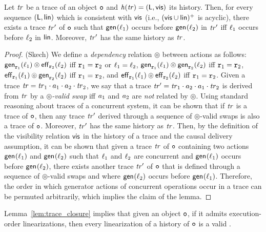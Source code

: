 \begin{lemma}\label{lem:trace_closure}
Let $\mathit{tr}$ be a trace of an object $\mathtt{o}$ and $\mathit{h}({\mathit{tr})}=(\mathsf{L},\mathsf{vis})$ its history. Then, for every sequence $(\mathsf{L},\mathsf{lin})$ which is consistent with $\mathsf{vis}$ (i.e., $(\mathsf{vis}
    \cup \mathsf{lin})^{+}$ is acyclic), there exists a trace $\mathit{tr}'$ of $\mathtt{o}$ such that $\mathsf{gen}_{}(\ell_1)$ occurs before $\mathsf{gen}_{}(\ell_2)$ in $\mathit{tr}'$ iff $\ell_1$ occurs before $\ell_2$ in $\mathsf{lin}$. Moreover, $\mathit{tr}'$ has the same history as $\mathit{tr}$.
\end{lemma}
\begin{proof}(Skech)
We define a \emph{dependency} relation $\circledcirc$ between actions as follows: $\mathsf{gen}_{\mathtt{r}_1}(\ell_1)\circledcirc \mathsf{eff}_{\mathtt{r}_2}(\ell_2)$ iff $\mathtt{r}_1=\mathtt{r}_2$ or $\ell_1=\ell_2$, $\mathsf{gen}_{\mathtt{r}_1}(\ell_1)\circledcirc \mathsf{gen}_{\mathtt{r}_2}(\ell_2)$ iff $\mathtt{r}_1=\mathtt{r}_2$, $\mathsf{eff}_{\mathtt{r}_1}(\ell_1)\circledcirc \mathsf{gen}_{\mathtt{r}_2}(\ell_2)$ iff $\mathtt{r}_1=\mathtt{r}_2$, and $\mathsf{eff}_{\mathtt{r}_1}(\ell_1)\circledcirc \mathsf{eff}_{\mathtt{r}_2}(\ell_2)$ iff $\mathtt{r}_1=\mathtt{r}_2$. Given a trace $\mathit{tr}=\mathit{tr}_1\cdot a_1\cdot a_2\cdot\mathit{tr}_2$, we say that a trace $\mathit{tr}'=\mathit{tr}_1\cdot a_2\cdot a_1\cdot\mathit{tr}_2$ is derived from $\mathit{tr}$ by a \emph{$\circledcirc$-valid swap} iff $a_1$ and $a_2$ are \emph{not} related by $\circledcirc$. Using standard reasoning about traces of a concurrent system, it can be shown that if $\mathit{tr}$ is a trace of $\mathtt{o}$, then any trace $\mathit{tr}'$ derived through a sequence of $\circledcirc$-valid swaps is also a trace of $\mathtt{o}$. Moreover, $\mathit{tr}'$ has the same history as $\mathit{tr}$. Then, by the definition of the visibility relation $\mathsf{vis}$ in the history of a trace and the causal delivery assumption, it can be shown that given a trace $\mathit{tr}$ of $\mathtt{o}$ containing two actions $\mathsf{gen}_{}(\ell_1)$ and $\mathsf{gen}_{}(\ell_2)$ such that $\ell_1$ and $\ell_2$ are concurrent and $\mathsf{gen}_{}(\ell_1)$ occurs before $\mathsf{gen}_{}(\ell_2)$, there exists another trace $\mathit{tr}'$ of $\mathtt{o}$ that is defined through a sequence of $\circledcirc$-valid swaps and where $\mathsf{gen}_{}(\ell_2)$ occurs before $\mathsf{gen}_{}(\ell_1)$. Therefore, the order in which generator actions of concurrent operations occur in a trace can be permuted arbitrarily, which implies the claim of the lemma.
\end{proof}

Lemma~\ref{lem:trace_closure} implies that given an \crdtlinearizable{} object $\mathtt{o}$, if it admits execution-order linearizations, then every linearization of a history of $\mathtt{o}$ is a valid \crdtlinearization{}.

